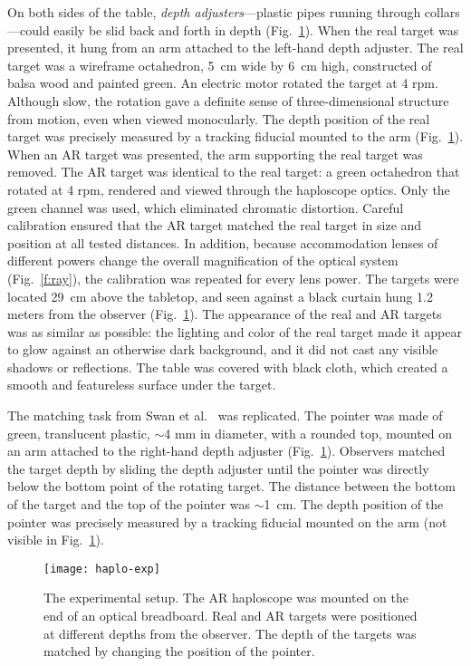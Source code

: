 \documentclass[10pt,journal,compsoc]{IEEEtran}
\makeatletter
\newlength{\FigWidth}
\newcommand{\etal}{et al.\@\xspace} %
\makeatother
\begin{document}
On both sides of the table, \emph{depth adjusters}---plastic pipes running through collars---could easily be slid back and forth in depth (Fig.~\ref{f:haplo-exp}).  When the real target was presented, it hung from an arm attached to the left-hand depth adjuster.  The real target was a wireframe octahedron, 5~cm wide by 6~cm high, constructed of balsa wood and painted green.  An electric motor rotated the target at 4 rpm.  Although slow, the rotation gave a definite sense of three-dimensional structure from motion, even when viewed monocularly.  The depth position of the real target was precisely measured by a tracking fiducial mounted to the arm (Fig.~\ref{f:haplo-exp}).  When an AR target was presented, the arm supporting the real target was removed.  The AR target was identical to the real target: a green octahedron that rotated at 4 rpm, rendered and viewed through the haploscope optics.  Only the green channel was used, which eliminated chromatic distortion.  Careful calibration ensured that the AR target matched the real target in size and position at all tested distances.  In addition, because accommodation lenses of different powers change the overall magnification of the optical system (Fig.~\ref{f:ray}), the calibration was repeated for every lens power.  The targets were located 29~cm above the tabletop, and seen against a black curtain hung 1.2 meters from the observer (Fig.~\ref{f:haplo-exp}).  The appearance of the real and AR targets was as similar as possible: the lighting and color of the real target made it appear to glow against an otherwise dark background, and it did not cast any visible shadows or reflections.  The table was covered with black cloth, which created a smooth and featureless surface under the target.


The matching task from Swan \etal~\cite{swan:2015} was replicated.  The pointer was made of green, translucent plastic, $\sim$4 mm in diameter, with a rounded top, mounted on an arm attached to the right-hand depth adjuster (Fig.~\ref{f:haplo-exp}).  Observers matched the target depth by sliding the depth adjuster until the pointer was directly below the bottom point of the rotating target.  The distance between the bottom of the target and the top of the pointer was $\sim$1~cm.  The depth position of the pointer was precisely measured by a tracking fiducial mounted on the arm (not visible in Fig.~\ref{f:haplo-exp}). 

\begin{figure}[!t]
\centering
\texttt{[image: haplo-exp]}
\caption{The experimental setup.  The AR haploscope was mounted on the end of an optical breadboard.  Real and AR targets were positioned at different depths from the observer.  The depth of the targets was matched by changing the position of the pointer.}
\label{f:haplo-exp}
\end{figure}
\end{document}
